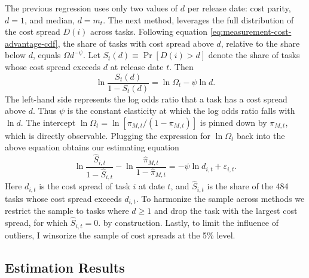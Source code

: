 \documentclass[11pt]{article}
\begin{document}
The previous regression uses only two values of $d$ per release date:
cost parity, $d=1$, and median, $d=m_{t}$. The next method, leverages
the full distribution of the cost spread $D(i)$ across tasks. Following
equation \eqref{eq:measurement-cost-advantage-cdf}, the share of
tasks with cost spread above $d$, relative to the share below $d$,
equals $\Omega d^{-\psi}$. Let $S_{t}(d)\equiv\Pr[D(i)>d]$ denote
the share of tasks whose cost spread exceeds $d$ at release date
$t$. Then
\[
\ln\frac{S_{t}(d)}{1-S_{t}(d)}=\ln\Omega_{t}-\psi\ln d.
\]
The left-hand side represents the log odds ratio that a task has a
cost spread above $d$. Thus $\psi$ is the constant elasticity at
which the log odds ratio falls with $\ln d$. The intercept $\ln\Omega_{t}=\ln[\pi_{M,t}/(1-\pi_{M,t})]$
is pinned down by $\pi_{M,t}$, which is directly observable. Plugging
the expression for $\ln\Omega_{t}$ back into the above equation obtains
our estimating equation 
\begin{equation}
\ln\frac{\widehat{S}_{i,t}}{1-\widehat{S}_{i,t}}-\ln\frac{\widehat{\pi}_{M,t}}{1-\widehat{\pi}_{M,t}}=-\psi\ln d_{i,t}+\varepsilon_{i,t}.\label{eq:task-regression}
\end{equation}
Here $d_{i,t}$ is the cost spread of task $i$ at date $t$, and
$\widehat{S}_{i,t}$ is the share of the 484 tasks whose
cost spread exceeds $d_{i,t}$. To harmonize the sample across methods
we restrict the sample to tasks where $d\geq1$ and drop the task
with the largest cost spread, for which $\widehat{S}_{i,t}=0$. by
construction. Lastly, to limit the influence of outliers, I winsorize
the sample of cost spreads at the 5\% level.

\subsection{Estimation Results}
\end{document}
